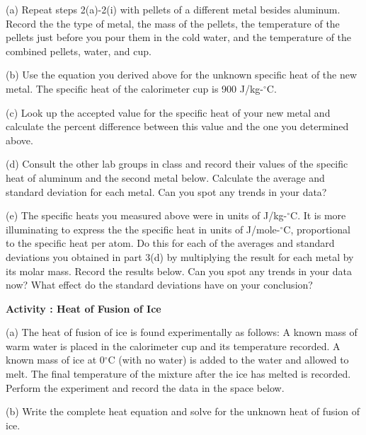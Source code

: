 (a) Repeat steps 2(a)-2(i) with pellets of a different metal besides aluminum.
Record the the type of metal, the mass of the pellets, the temperature of the
pellets just before you pour them in the cold water, and the temperature of the
combined pellets, water, and cup.
\vspace{15mm}

\newpage 

(b) Use the equation you derived above for the unknown specific
heat of the new metal. 
The specific heat of the calorimeter cup is 900 J/kg-\( ^{\circ } \)C.

\vspace{2.5cm}

(c) Look up the accepted value for the specific heat of your new metal and
calculate the percent difference between this value and the one you
determined above. 
\vspace{20mm}

(d) Consult the other lab groups in class and record their values of the specific
heat of aluminum and the second metal below.
Calculate the average and standard deviation for each metal.
Can you spot any trends in your data?
\vspace{2in}

(e) The specific heats you measured above were in units of J/kg-\( ^{\circ } \)C. 
It is more illuminating  to express the the specific heat in units
of J/mole-\( ^{\circ } \)C, proportional to the specific heat per atom.
Do this for each of the averages and standard deviations you obtained in part
3(d) by multiplying the result
for each metal by its molar mass. Record the results below.
Can you spot any trends in your data now?
What effect do the standard deviations have on your conclusion?
\vspace{2in}

\newpage 

\textbf{Activity : Heat of Fusion of Ice}

(a) The heat of fusion of ice is found experimentally as follows:
A known mass of warm water is placed in the calorimeter cup and its
temperature recorded. A known mass of ice at 0\( ^{\circ } \)C (with
no water) is added to the water and allowed to melt. The final temperature
of the mixture after the ice has melted is recorded. Perform the experiment
and record the data in the space below.

\vspace{25mm}

(b) Write the complete heat equation and solve for the unknown heat
of fusion of ice.\vspace{25mm}


